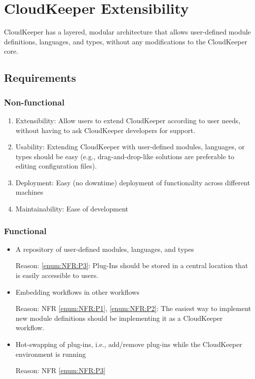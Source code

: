 
\chapter{CloudKeeper Extensibility}

CloudKeeper has a layered, modular architecture that allows user-defined module definitions, languages, and types, without any modifications to the CloudKeeper core.

\section{Requirements}

\subsection{Non-functional}

\begin{enumerate}
	\item \label{enum:NFR:P1} Extensibility: Allow users to extend CloudKeeper according to user needs, without having to ask CloudKeeper developers for support.
	\item \label{enum:NFR:P2} Usability: Extending CloudKeeper with user-defined modules, languages, or types should be easy (e.g., drag-and-drop-like solutions are preferable to editing configuration files).
	\item \label{enum:NFR:P3} Deployment: Easy (no downtime) deployment of functionality across different machines
	\item \label{enum:NFR:P4} Maintainability: Ease of development
\end{enumerate}

\subsection{Functional}

\begin{itemize}
	\item A repository of user-defined modules, languages, and types

		Reason: \ref{enum:NFR:P3}: Plug-Ins should be stored in a central location that is easily accessible to users.

	\item Embedding workflows in other workflows

		Reason: NFR \ref{enum:NFR:P1}, \ref{enum:NFR:P2}: The easiest way to implement new module definitions should be implementing it as a CloudKeeper workflow.

	\item Hot-swapping of plug-ins, i.e., add/remove plug-ins while the CloudKeeper environment is running

		Reason: NFR \ref{enum:NFR:P3}
\end{itemize}

